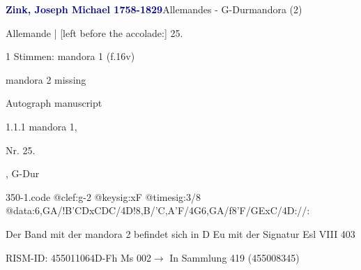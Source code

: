 \documentclass[twocolumn]{book}
\begin{document}
\par \vspace{7pt} \textcolor{darkblue}{\textbf{Zink, Joseph Michael  1758-1829}}\hfillplus{\textbf{[350]}}\newline Allemandes - G-Dur\newline mandora (2)
\par \begin{itshape}[f.16v, at left:] Allemande | [left before the accolade:] 25.\end{itshape} 
\par \textcolor{darkblue}{}  1 Stimmen: mandora 1  (f.16v)\newline \begin{small} mandora 2 missing\end{small} \newline Autograph manuscript
\par 1.1.1  mandora 1, \begin{itshape}Nr. 25.\end{itshape}, G-Dur  
\begin{filecontents*}{350-1.code}
@clef:g-2
@keysig:xF
@timesig:3/8
@data:{6,GA}/!{B'CD}{xCDC}/4D!8,B/'C,A'F/4G{6,GA}/f8'F/GExC/4D://:
\end{filecontents*}
\newline
%
\par Der Band mit der mandora 2 befindet sich in D Eu mit der Signatur Esl VIII 403
\par RISM-ID: 455011064\newline D-Fh  Ms 002\newline $\rightarrow$ In Sammlung 419 (455008345)
      
\end{document}
